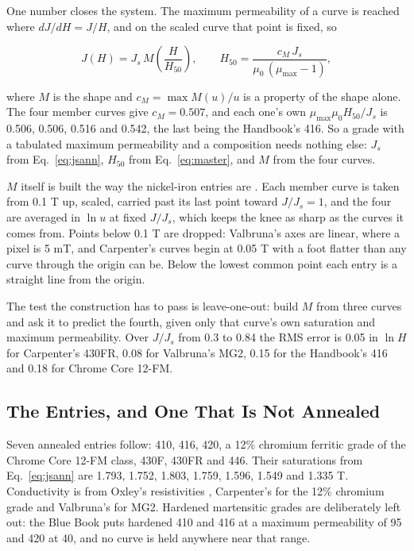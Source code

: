 \documentclass[
  11pt,
]{article}
\begin{document}
One number closes the system. The maximum permeability of a curve is reached where \(dJ/dH = J/H\), and on the scaled curve that point is fixed, so

\begin{equation}\label{eq:master}
J(H) = J_s\,M\!\left(\frac{H}{H_{50}}\right), \qquad H_{50} = \frac{c_M\,J_s}{\mu_0\,(\mu_{\max} - 1)},
\end{equation}

where \(M\) is the shape and \(c_M = \max M(u)/u\) is a property of the shape alone. The four member curves give \(c_M = 0.507\), and each one's own \(\mu_{\max}\mu_0 H_{50}/J_s\) is 0.506, 0.506, 0.516 and 0.542, the last being the Handbook's 416. So a grade with a tabulated maximum permeability and a composition needs nothing else: \(J_s\) from Eq.~\eqref{eq:jsann}, \(H_{50}\) from Eq.~\eqref{eq:master}, and \(M\) from the four curves.

\(M\) itself is built the way the nickel-iron entries are \cite{meeker-nife}. Each member curve is taken from 0.1 T up, scaled, carried past its last point toward \(J/J_s = 1\), and the four are averaged in \(\ln u\) at fixed \(J/J_s\), which keeps the knee as sharp as the curves it comes from. Points below 0.1 T are dropped: Valbruna's axes are linear, where a pixel is 5 mT, and Carpenter's curves begin at 0.05 T with a foot flatter than any curve through the origin can be. Below the lowest common point each entry is a straight line from the origin.

The test the construction has to pass is leave-one-out: build \(M\) from three curves and ask it to predict the fourth, given only that curve's own saturation and maximum permeability. Over \(J/J_s\) from 0.3 to 0.84 the RMS error is 0.05 in \(\ln H\) for Carpenter's 430FR, 0.08 for Valbruna's MG2, 0.15 for the Handbook's 416 and 0.18 for Chrome Core 12-FM.

\subsection{The Entries, and One That Is Not Annealed}\label{annealed-entries}

Seven annealed entries follow: 410, 416, 420, a 12\% chromium ferritic grade of the Chrome Core 12-FM class, 430F, 430FR and 446. Their saturations from Eq.~\eqref{eq:jsann} are 1.793, 1.752, 1.803, 1.759, 1.596, 1.549 and 1.335 T. Conductivity is from Oxley's resistivities \cite{oxley}, Carpenter's for the 12\% chromium grade and Valbruna's for MG2. Hardened martensitic grades are deliberately left out: the Blue Book puts hardened 410 and 416 at a maximum permeability of 95 and 420 at 40, and no curve is held anywhere near that range.
\end{document}
